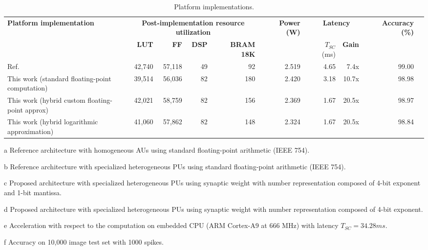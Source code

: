 \begin{table}[!t]
	\begin{threeparttable}
		\centering
		\caption{Platform implementations.}\label{tab:platform_comparison}
		\scriptsize
		\begin{tabular}{lrrrrrrrrrrrrr}\toprule
			\multirow{2}{*}{\textbf{Platform implementation}} & &\multicolumn{4}{c}{\textbf{Post-implementation resource utilization}} & &\multirow{2}{*}{\textbf{Power (W)}} & &\multicolumn{2}{c}{\textbf{Latency}} & &\multirow{2}{*}{\textbf{Accuracy (\%)\tnote{f}}} \\\cmidrule{3-6}\cmidrule{10-11}
			& &\textbf{LUT} &\textbf{FF} &\textbf{DSP} &\textbf{BRAM 18K} & & & &$T_{SC}$ (ms) &\textbf{Gain\tnote{e}} & & \\\midrule
			Ref. \cite{nevarez2020accelerator}\tnote{a} & &42,740 &57,118 &49 &92 & &2.519 & &4.65 &7.4x & &99.00 \\
			This work (standard floating-point computation)\tnote{b} & &39,514 &56,036 &82 &180 & &2.420 & &3.18 &10.7x & &98.98 \\
			This work (hybrid custom floating-point approx)\tnote{c} & &42,021 &58,759 &82 &156 & &2.369 & &1.67 &20.5x & &98.97 \\
			This work (hybrid logarithmic approximation)\tnote{d} & &41,060 &57,862 &82 &148 & &2.324 & &1.67 &20.5x & &98.84 \\
			\bottomrule
		\end{tabular}
		\begin{tablenotes}
			\scriptsize
			\item[a] Reference architecture with homogeneous AUs using standard floating-point arithmetic (IEEE 754).
			\item[b] Reference architecture with specialized heterogeneous PUs using standard floating-point arithmetic (IEEE 754).
			\item[c] Proposed architecture with specialized heterogeneous PUs using synaptic weight with number representation composed of 4-bit exponent and 1-bit mantissa.
			\item[d] Proposed architecture with specialized heterogeneous PUs using synaptic weight with number representation composed of 4-bit exponent.
			\item[e] Acceleration with respect to the computation on embedded CPU (ARM Cortex-A9 at 666 MHz) with latency $T_{SC} = 34.28 ms$.
			\item[f] Accuracy on 10,000 image test set with 1000 spikes.
		\end{tablenotes}
	\end{threeparttable}
\end{table}

